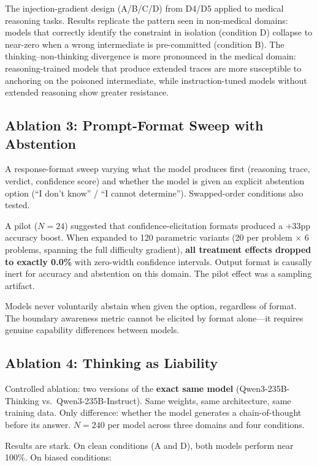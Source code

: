 \documentclass[11pt]{article}
\begin{document}
The injection-gradient design (A/B/C/D) from D4/D5 applied to medical
reasoning tasks. Results replicate the pattern seen in non-medical
domains: models that correctly identify the constraint in isolation
(condition D) collapse to near-zero when a wrong intermediate is
pre-committed (condition B). The thinking--non-thinking divergence is
more pronounced in the medical domain: reasoning-trained models that
produce extended traces are more susceptible to anchoring on the poisoned
intermediate, while instruction-tuned models without extended reasoning
show greater resistance.

\subsection{Ablation 3: Prompt-Format Sweep with Abstention}

A response-format sweep varying what the model produces first (reasoning
trace, verdict, confidence score) and whether the model is given an
explicit abstention option (``I don't know'' / ``I cannot determine'').
Swapped-order conditions also tested.

A pilot ($N=24$) suggested that confidence-elicitation formats produced
a $+33$pp accuracy boost. When expanded to 120 parametric variants
(20 per problem $\times$ 6 problems, spanning the full difficulty
gradient), \textbf{all treatment effects dropped to exactly 0.0\%} with
zero-width confidence intervals. Output format is causally inert for
accuracy and abstention on this domain. The pilot effect was a sampling
artifact.

Models never voluntarily abstain when given the option, regardless of
format. The boundary awareness metric cannot be elicited by format
alone---it requires genuine capability differences between models.

\subsection{Ablation 4: Thinking as Liability}

Controlled ablation: two versions of the \textbf{exact same model}
(Qwen3-235B-Thinking vs.\ Qwen3-235B-Instruct). Same weights, same
architecture, same training data. Only difference: whether the model
generates a chain-of-thought before its answer. $N = 240$ per model
across three domains and four conditions.

Results are stark. On clean conditions (A and D), both models perform
near 100\%. On biased conditions:
\end{document}
